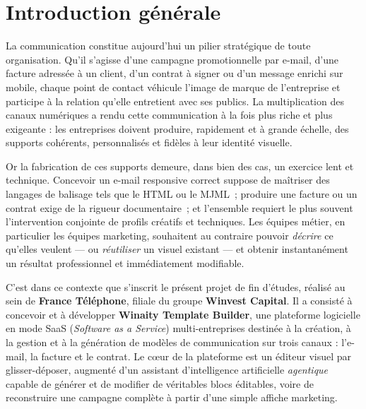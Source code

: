 \documentclass[12pt,a4paper,oneside]{report}
\begin{document}
\cleardoublepage
{}

\chapter*{Introduction générale}

La communication constitue aujourd'hui un pilier stratégique de toute
organisation. Qu'il s'agisse d'une campagne promotionnelle par e-mail,
d'une facture adressée à un client, d'un contrat à signer ou d'un message
enrichi sur mobile, chaque point de contact véhicule l'image de marque de
l'entreprise et participe à la relation qu'elle entretient avec ses
publics. La multiplication des canaux numériques a rendu cette
communication à la fois plus riche et plus exigeante : les entreprises
doivent produire, rapidement et à grande échelle, des supports cohérents,
personnalisés et fidèles à leur identité visuelle.

Or la fabrication de ces supports demeure, dans bien des cas, un exercice
lent et technique. Concevoir un e-mail responsive correct suppose de
maîtriser des langages de balisage tels que le HTML ou le MJML~; produire
une facture ou un contrat exige de la rigueur documentaire~; et l'ensemble
requiert le plus souvent l'intervention conjointe de profils créatifs et
techniques. Les équipes métier, en particulier les équipes marketing,
souhaitent au contraire pouvoir \emph{décrire} ce qu'elles veulent — ou
\emph{réutiliser} un visuel existant — et obtenir instantanément un
résultat professionnel et immédiatement modifiable.

C'est dans ce contexte que s'inscrit le présent projet de fin d'études,
réalisé au sein de \textbf{France Téléphone}, filiale du groupe
\textbf{Winvest Capital}. Il a consisté à concevoir et à développer
\textbf{Winaity Template Builder}, une plateforme logicielle en mode SaaS
(\emph{Software as a Service}) multi-entreprises destinée à la création, à
la gestion et à la génération de modèles de communication sur trois canaux :
l'e-mail, la facture et le contrat. Le c\oe{}ur de
la plateforme est un éditeur visuel par glisser-déposer, augmenté d'un
assistant d'intelligence artificielle \emph{agentique} capable de générer
et de modifier de véritables blocs éditables, voire de reconstruire une
campagne complète à partir d'une simple affiche marketing.
\end{document}
